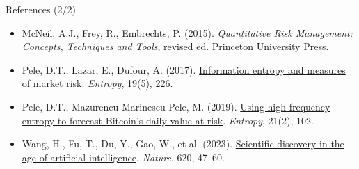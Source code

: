 \begin{frame}{References (2/2)}
\begin{itemize}
    \item McNeil, A.J., Frey, R., Embrechts, P. (2015). \href{https://press.princeton.edu/books/hardcover/9780691166278/quantitative-risk-management}{\textit{Quantitative Risk Management: Concepts, Techniques and Tools}}, revised ed. Princeton University Press.
    \item Pele, D.T., Lazar, E., Dufour, A. (2017). \href{https://doi.org/10.3390/e19050226}{Information entropy and measures of market risk}. \textit{Entropy}, 19(5), 226.
    \item Pele, D.T., Mazurencu-Marinescu-Pele, M. (2019). \href{https://doi.org/10.3390/e21020102}{Using high-frequency entropy to forecast Bitcoin's daily value at risk}. \textit{Entropy}, 21(2), 102.
    \item Wang, H., Fu, T., Du, Y., Gao, W., et al. (2023). \href{https://doi.org/10.1038/s41586-023-06221-2}{Scientific discovery in the age of artificial intelligence}. \textit{Nature}, 620, 47--60.
\end{itemize}
\end{frame}


